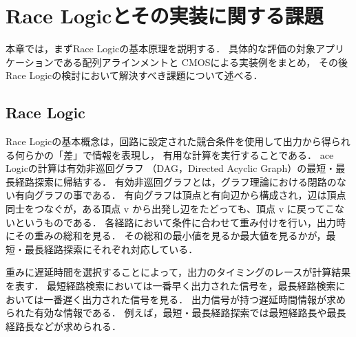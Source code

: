\chapter{Race Logicとその実装に関する課題}
本章では，まずRace Logicの基本原理を説明する．
具体的な評価の対象アプリケーションである配列アラインメントと
CMOSによる実装例をまとめ，
その後Race Logicの検討において解決すべき課題について述べる．

\section{Race Logic}
Race Logicの基本概念は，回路に設定された競合条件を使用して出力から得られる何らかの「差」で情報を表現し，
有用な計算を実行することである．
ace Logicの計算は有効非巡回グラフ
（DAG，Directed Acyclic Graph）の最短・最長経路探索に帰結する．
有効非巡回グラフとは，グラフ理論における閉路のない有向グラフの事である．
有向グラフは頂点と有向辺から構成され，辺は頂点同士をつなぐが，ある頂点 v から出発し辺をたどっても、頂点 v に戻ってこないというものである．
各経路において条件に合わせて重み付けを行い，出力時にその重みの総和を見る．
その総和の最小値を見るか最大値を見るかが，最短・最長経路探索にそれぞれ対応している．

重みに遅延時間を選択することによって，出力のタイミングのレースが計算結果を表す．
最短経路検索においては一番早く出力された信号を，最長経路検索においては一番遅く出力された信号を見る．
出力信号が持つ遅延時間情報が求められた有効な情報である．
例えば，最短・最長経路探索では最短経路長や最長経路長などが求められる．

